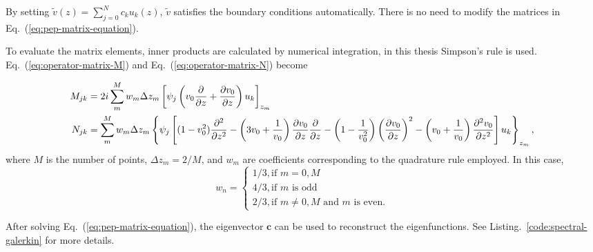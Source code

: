 By setting $\tilde{v}(z) = \sum_{j=0}^{N} c_ku_k(z)$, $\tilde{v}$ satisfies the boundary conditions automatically. There is no need to modify the matrices in Eq.~(\ref{eq:pep-matrix-equation}).

To evaluate the matrix elements, inner products are calculated by numerical integration, in this thesis Simpson's rule is used. Eq.~(\ref{eq:operator-matrix-M}) and Eq.~(\ref{eq:operator-matrix-N}) become

\begin{align}
	M_{jk} & = 2i \sum_{m}^{M} w_m \Delta z_m \left[\psi_{j}\left(v_0\pdv{}{z} +\pdv{v_0}{z} \right)u_{k}\right]_{z_m} \\
	N_{jk} & = \sum_{m}^{M} w_m \Delta z_m \left\{
	\psi_{j} \left[(1-v_0^2)\pdv[2]{}{z} -\left(3v_0 + \frac{1}{v_0}\right)\pdv{v_0}{z}\pdv{}{z}
		- \left(1-\frac{1}{v_0^2}\right)\left(\pdv{v_0}{z}\right)^2 - \left(v_0+\frac{1}{v_0}\right)\pdv[2]{v_0}{z}\right] u_{k} \right\}_{z_m},
\end{align}
where $M$ is the number of points, $\Delta z_m = 2/M$, and $w_m$ are coefficients corresponding to the quadrature rule employed. In this case,
\begin{equation}
	w_n = \begin{cases}
		1/3, \text{if $m=0,M$}    \\
		4/3, \text{if $m$ is odd} \\
		2/3, \text{if $m\neq 0,M$ and $m$ is even}.
	\end{cases}
\end{equation}

After solving Eq.~(\ref{eq:pep-matrix-equation}), the eigenvector $\mathbf{c}$ can be used to reconstruct the eigenfunctions. See Listing.~\ref{code:spectral-galerkin} for more details.

